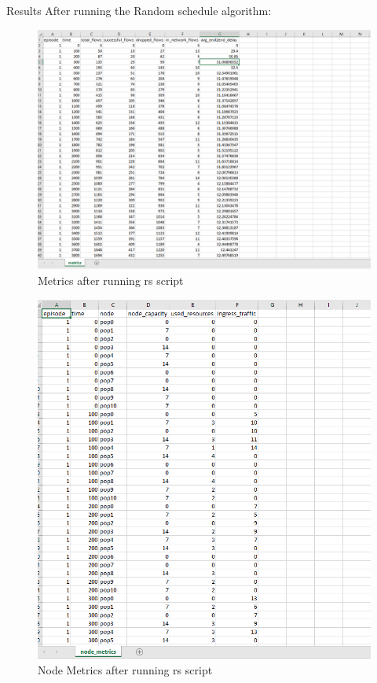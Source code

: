Results After running the Random schedule algorithm:

\begin{figure}[h]
    \centering
    \includegraphics[width=1\textwidth]{rsmetrics}
    \caption{Metrics after running rs script}
    \label{fig:rsmetrics}
\end{figure}


\begin{figure}[h]
    \centering
    \includegraphics[width=1\textwidth]{rsnodemetrics}
    \caption{Node Metrics after running rs script}
    \label{fig:rsnodemetrics}
\end{figure}


